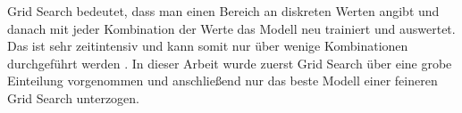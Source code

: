 Grid Search bedeutet, dass man einen Bereich an diskreten Werten angibt und danach mit jeder Kombination der Werte das Modell neu trainiert und auswertet.
Das ist sehr zeitintensiv und kann somit nur \"uber wenige Kombinationen durchgef\"uhrt werden \cite[Seiten 76 bis 78]{handson}. In dieser Arbeit wurde zuerst Grid Search \"uber eine grobe Einteilung
vorgenommen und anschlie{\ss}end nur das beste Modell einer feineren Grid Search unterzogen.





